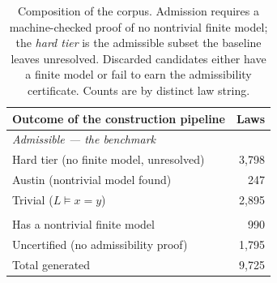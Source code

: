 %
%


\begin{table}[t]
\centering
\small
\begin{tabular}{lr}
\toprule
Outcome of the construction pipeline & Laws \\
\midrule
\multicolumn{2}{l}{\emph{Admissible --- the benchmark}} \\
\quad Hard tier (no finite model, unresolved) & 3{,}798 \\
\quad Austin (nontrivial model found)          & 247 \\
\quad Trivial ($L \models x{=}y$)              & 2{,}895 \\
\addlinespace
\multicolumn{2}{l}{\emph{Discarded}} \\
\quad Has a nontrivial finite model            & 990 \\
\quad Uncertified (no admissibility proof)     & 1{,}795 \\
\midrule
Total generated                                & 9{,}725 \\
\bottomrule
\end{tabular}
\caption{Composition of the corpus. Admission requires a machine-checked proof of no
nontrivial finite model; the \emph{hard tier} is the admissible subset the baseline
leaves unresolved. Discarded candidates either have a finite model or fail to earn the
admissibility certificate. Counts are by distinct law string.
}
\label{tab:corpus-composition}
\end{table}


